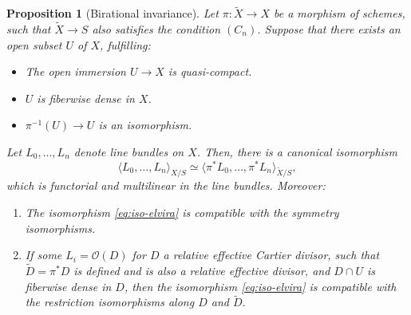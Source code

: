 \documentclass[11pt]{article}
\theoremstyle{plain}
\newtheorem{proposition}[theorem]{Proposition}
\theoremstyle{definition}
\newcommand{\Ocal}{\mathcal O}
\begin{document}
\begin{proposition}[Birational invariance]\label{prop:elvira}
Let $\pi \colon \widetilde{X} \to X$ be a morphism of schemes, such that $\widetilde{X} \to S$ also satisfies the condition $(C_n)$. Suppose that there exists an open subset $U$ of $X$, fulfilling:
\begin{itemize}
\item The open immersion $U \to X$ is quasi-compact.
\item $U$ is fiberwise dense in $X$.
\item $\pi^{-1}(U)\to U$ is an isomorphism.
\end{itemize}
Let $L_{0},\ldots, L_{n}$ denote line bundles on $X$. Then, there is a canonical isomorphism
\begin{equation}\label{eq:iso-elvira}
\langle L_0, \ldots, L_n \rangle_{X/S} \simeq \langle \pi^\ast L_0, \ldots, \pi^\ast L_n \rangle_{\widetilde{X}/S},
\end{equation}
which is functorial and multilinear in the line bundles. Moreover:
\begin{enumerate}
\item\label{item:elvira-1} The isomorphism \eqref{eq:iso-elvira} is compatible with the symmetry isomorphisms.
\item\label{item:elvira-3} If some $L_{i}=\Ocal(D)$ for $D$ a relative effective Cartier divisor, such that $\widetilde{D} = \pi^{\ast} D$ is defined and is also a relative effective divisor, and $D\cap U$ is fiberwise dense in $D$, then the isomorphism \eqref{eq:iso-elvira} is compatible with the restriction isomorphisms along $D$ and $\widetilde{D}$.
\end{enumerate}

\end{proposition}
\end{document}

